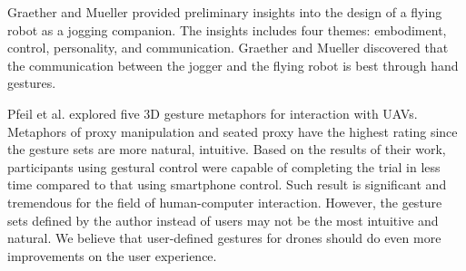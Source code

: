 \documentclass{sigchi}
\begin{document}
Graether and Mueller \cite{Graether:2012:JFR:2212776.2212386} provided preliminary insights into the design of a flying robot as a jogging companion. The insights includes four themes: embodiment, control, personality, and communication. Graether and Mueller discovered that the communication between the jogger and the flying robot is best through hand gestures.

Pfeil et al. \cite{Pfeil:2013:EGM:2449396.2449429} explored five 3D gesture metaphors for interaction with UAVs. Metaphors of proxy manipulation and seated proxy have the highest rating since the gesture sets are more natural, intuitive. Based on the results of their work, participants using gestural control were capable of completing the trial in less time compared to that using smartphone control. Such result is significant and tremendous for the field of human-computer interaction. However, the gesture sets defined by the author instead of users may not be the most intuitive and natural. We believe that user-defined gestures for drones should do even more improvements on the user experience.



\end{document}
